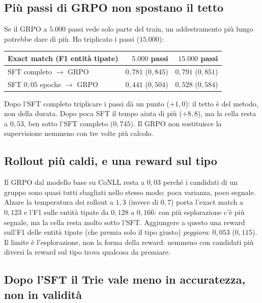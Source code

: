 \subsection{Più passi di GRPO non spostano il tetto}
\label{sec:grpo-lungo}

Se il GRPO a $5.000$ passi vede solo parte del train, un addestramento più
lungo potrebbe dare di più. Ho triplicato i passi ($15.000$):

\begin{center}
\small
\begin{tabular}{lrr}
\toprule
Exact match (F1 entità tipate) & $5.000$ passi & $15.000$ passi \\
\midrule
SFT completo $\to$ GRPO        & $0{,}781$ ($0{,}845$) & $0{,}791$ ($0{,}851$) \\
SFT $0{,}05$ epoche $\to$ GRPO & $0{,}441$ ($0{,}504$) & $0{,}528$ ($0{,}584$) \\
\bottomrule
\end{tabular}
\end{center}

Dopo l'SFT completo triplicare i passi dà un punto ($+1{,}0$): il tetto è del
metodo, non della durata. Dopo poca SFT il tempo aiuta di più ($+8{,}8$), ma la
cella resta a $0{,}53$, ben sotto l'SFT completo ($0{,}745$). Il GRPO non
sostituisce la supervisione nemmeno con tre volte più calcolo.

\subsection{Rollout più caldi, e una reward sul tipo}
\label{sec:rollout-caldi}

Il GRPO dal modello base su CoNLL resta a $0{,}03$ perché i candidati di un
gruppo sono quasi tutti sbagliati nello stesso modo: poca varianza, poco
segnale. Alzare la temperatura dei rollout a $1{,}3$ (invece di $0{,}7$) porta
l'exact match a $0{,}123$ e l'F1 sulle entità tipate da $0{,}128$ a $0{,}166$:
con più esplorazione c'è più segnale, ma la cella resta molto sotto l'SFT.
Aggiungere a questo una reward sull'F1 delle entità tipate (che premia solo il
tipo giusto) \emph{peggiora}: $0{,}053$ ($0{,}115$). Il limite è
l'esplorazione, non la forma della reward: nemmeno con candidati più diversi la
reward sul tipo trova qualcosa da premiare.

\subsection{Dopo l'SFT il Trie vale meno in accuratezza, non in validità}
\label{sec:sft-senza-trie}

